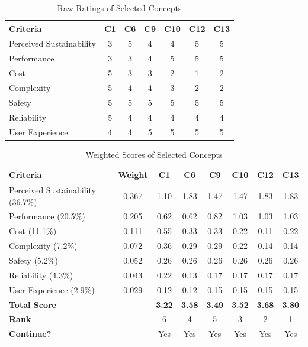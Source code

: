 \documentclass[12pt]{report}
\begin{document}
\begin{table}[h!]
\centering
\caption{Raw Ratings of Selected Concepts}
\label{tab:revised_raw_ratings}
\begin{tabular}{l c c c c c c}
\toprule
\textbf{Criteria} & \textbf{C1} & \textbf{C6} & \textbf{C9} & \textbf{C10} & \textbf{C12} & \textbf{C13} \\
\midrule
Perceived Sustainability & 3 & 5 & 4 & 4 & 5 & 5 \\
Performance              & 3 & 3 & 4 & 5 & 5 & 5 \\
Cost                     & 5 & 3 & 3 & 2 & 1 & 2 \\
Complexity               & 5 & 4 & 4 & 3 & 2 & 2 \\
Safety                   & 5 & 5 & 5 & 5 & 5 & 5 \\
Reliability              & 5 & 4 & 4 & 4 & 4 & 4 \\
User Experience          & 4 & 4 & 5 & 5 & 5 & 5 \\
\bottomrule
\end{tabular}
\end{table}

\begin{table}[h!]
\centering
\caption{Weighted Scores of Selected Concepts}
\label{tab:revised_weighted_scores}
\begin{tabular}{l c c c c c c c}
\toprule
\textbf{Criteria} & \textbf{Weight} & \textbf{C1} & \textbf{C6} & \textbf{C9} & \textbf{C10} & \textbf{C12} & \textbf{C13} \\
\midrule
Perceived Sustainability (36.7\%) & 0.367 & 1.10 & 1.83 & 1.47 & 1.47 & 1.83 & 1.83 \\
Performance (20.5\%)              & 0.205 & 0.62 & 0.62 & 0.82 & 1.03 & 1.03 & 1.03 \\
Cost (11.1\%)                     & 0.111 & 0.55 & 0.33 & 0.33 & 0.22 & 0.11 & 0.22 \\
Complexity (7.2\%)                & 0.072 & 0.36 & 0.29 & 0.29 & 0.22 & 0.14 & 0.14 \\
Safety (5.2\%)                    & 0.052 & 0.26 & 0.26 & 0.26 & 0.26 & 0.26 & 0.26 \\
Reliability (4.3\%)               & 0.043 & 0.22 & 0.13 & 0.17 & 0.17 & 0.17 & 0.17 \\
User Experience (2.9\%)           & 0.029 & 0.12 & 0.12 & 0.15 & 0.15 & 0.15 & 0.15 \\
\midrule
\textbf{Total Score}              &       & \textbf{3.22} & \textbf{3.58} & \textbf{3.49} & \textbf{3.52} & \textbf{3.68} & \textbf{3.80} \\
\textbf{Rank}                     &       & 6 & 4 & 5 & 3 & 2 & 1 \\
\textbf{Continue?}                &       & Yes & Yes & Yes & Yes & Yes & Yes \\
\bottomrule
\end{tabular}
\end{table}
\end{document}
